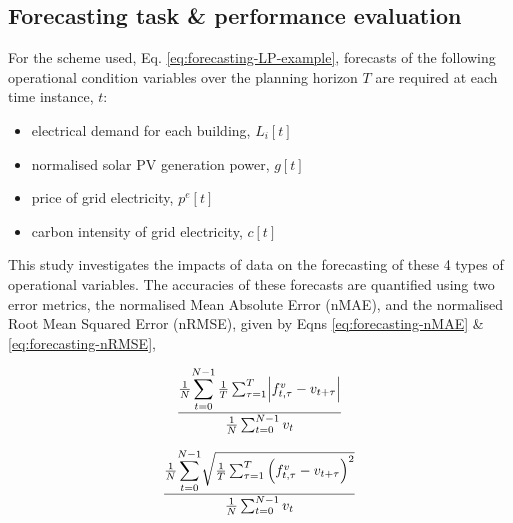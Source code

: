 \clearpage
\subsection{Forecasting task \& performance evaluation}


For the  scheme used, Eq. \ref{eq:forecasting-LP-example}, forecasts of the following operational condition variables over the planning horizon $T$ are required at each time instance, $t$:
\begin{itemize}
    \item electrical demand for each building, $L_i[t]$
    \item normalised solar PV generation power, $g[t]$
    \item price of grid electricity, $p^e[t]$
    \item carbon intensity of grid electricity, $c[t]$
\end{itemize}

This study investigates the impacts of data on the forecasting of these 4 types of operational variables. The accuracies of these forecasts are quantified using two error metrics, the normalised Mean Absolute Error (nMAE), and the normalised Root Mean Squared Error (nRMSE), given by Eqns \ref{eq:forecasting-nMAE} \& \ref{eq:forecasting-nRMSE},

\vspace*{0.5cm}
\begin{minipage}{0.5\linewidth}
\begin{equation} \label{eq:forecasting-nMAE}
    \frac{\frac{1}{N} \mathlarger{\sum_{t=0}^{N-1}} \, \frac{1}{T} \sum_{\tau=1}^{T} \abs{f^v_{t,\tau} - v_{t+\tau} } }{\frac{1}{N} \sum_{t=0}^{N-1} v_t}
\end{equation}
\end{minipage}%
\begin{minipage}{0.5\linewidth}
\begin{equation} \label{eq:forecasting-nRMSE}
    \frac{\frac{1}{N} \mathlarger{\sum_{t=0}^{N-1}} \sqrt{ \frac{1}{T} \sum_{\tau=1}^{T} \left(f^v_{t,\tau} - v_{t+\tau} \right)^2 } }{\frac{1}{N} \sum_{t=0}^{N-1} v_t}
\end{equation}
\end{minipage}
\vspace*{0.5cm}

